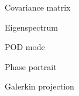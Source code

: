 \documentclass[aspectratio=169]{beamer}
\begin{document}
\begin{frame}
  \vfill

  \begin{minipage}{.48\textwidth}
    Covariance matrix
  \end{minipage}%
  \hfill
  \begin{minipage}{.48\textwidth}
    Eigenspectrum
  \end{minipage}

  \vfill
\end{frame}

\begin{frame}
  \vfill

  \begin{minipage}{.48\textwidth}
    POD mode
  \end{minipage}%
  \hfill
  \begin{minipage}{.48\textwidth}
    Phase portrait
  \end{minipage}

  \vfill
\end{frame}

\begin{frame}{Galerkin projection}

\end{frame}
\end{document}
